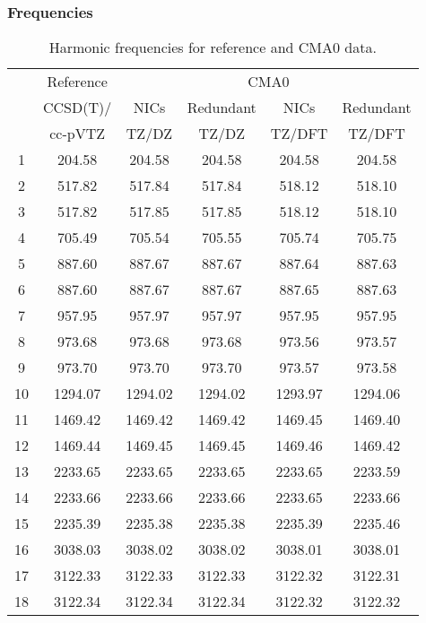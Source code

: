 \documentclass[10pt,oneside]{article}
\begin{document}
\begin{table}[h!]
\subsubsection*{Frequencies}
\centering
\caption{Harmonic frequencies for reference and CMA0 data.}
\begin{tabular}{cccccc}
\toprule
{} & Reference & \multicolumn{4}{c}{CMA0} \\
{} &  CCSD(T)/ &    NICs &  Redundant &    NICs & Redundant \\
{} &   cc-pVTZ &   TZ/DZ &      TZ/DZ &  TZ/DFT &    TZ/DFT \\
\midrule
1  &    204.58 &  204.58 &     204.58 &  204.58 &    204.58 \\
2  &    517.82 &  517.84 &     517.84 &  518.12 &    518.10 \\
3  &    517.82 &  517.85 &     517.85 &  518.12 &    518.10 \\
4  &    705.49 &  705.54 &     705.55 &  705.74 &    705.75 \\
5  &    887.60 &  887.67 &     887.67 &  887.64 &    887.63 \\
6  &    887.60 &  887.67 &     887.67 &  887.65 &    887.63 \\
7  &    957.95 &  957.97 &     957.97 &  957.95 &    957.95 \\
8  &    973.68 &  973.68 &     973.68 &  973.56 &    973.57 \\
9  &    973.70 &  973.70 &     973.70 &  973.57 &    973.58 \\
10 &   1294.07 & 1294.02 &    1294.02 & 1293.97 &   1294.06 \\
11 &   1469.42 & 1469.42 &    1469.42 & 1469.45 &   1469.40 \\
12 &   1469.44 & 1469.45 &    1469.45 & 1469.46 &   1469.42 \\
13 &   2233.65 & 2233.65 &    2233.65 & 2233.65 &   2233.59 \\
14 &   2233.66 & 2233.66 &    2233.66 & 2233.65 &   2233.66 \\
15 &   2235.39 & 2235.38 &    2235.38 & 2235.39 &   2235.46 \\
16 &   3038.03 & 3038.02 &    3038.02 & 3038.01 &   3038.01 \\
17 &   3122.33 & 3122.33 &    3122.33 & 3122.32 &   3122.31 \\
18 &   3122.34 & 3122.34 &    3122.34 & 3122.32 &   3122.32 \\
\bottomrule
\end{tabular}
\end{table}
\end{document}
